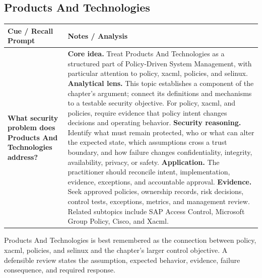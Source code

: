 \documentclass[11pt]{article}
\newcommand{\CornellHeader}{%
\rowcolor{Navy}\color{white}\bfseries Cue / Recall Prompt & \color{white}\bfseries Notes / Analysis\\\hline}
\newcommand{\CornellRow}[2]{%
\cellcolor{CueGray}\RaggedRight\textbf{#1} & \RaggedRight #2\\\hline}
\begin{document}
\subsection*{Products And Technologies}
\begin{longtable}{>{\RaggedRight\arraybackslash}p{}|>{\RaggedRight\arraybackslash}p{}}
\CornellHeader
\CornellRow{What security problem does Products And Technologies address?}{\textbf{Core idea.} Treat Products And Technologies as a structured part of Policy-Driven System Management, with particular attention to policy, xacml, policies, and selinux. \textbf{Analytical lens.} This topic establishes a component of the chapter's argument; connect its definitions and mechanisms to a testable security objective. For policy, xacml, and policies, require evidence that policy intent changes decisions and operating behavior. \textbf{Security reasoning.} Identify what must remain protected, who or what can alter the expected state, which assumptions cross a trust boundary, and how failure changes confidentiality, integrity, availability, privacy, or safety. \textbf{Application.} The practitioner should reconcile intent, implementation, evidence, exceptions, and accountable approval. \textbf{Evidence.} Seek approved policies, ownership records, risk decisions, control tests, exceptions, metrics, and management review. Related subtopics include SAP Access Control, Microsoft Group Policy, Cisco, and Xacml.}
\end{longtable}
\begin{topicsummary}
Products And Technologies is best remembered as the connection between policy, xacml, policies, and selinux and the chapter's larger control objective. A defensible review states the assumption, expected behavior, evidence, failure consequence, and required response.
\end{topicsummary}
\end{document}
